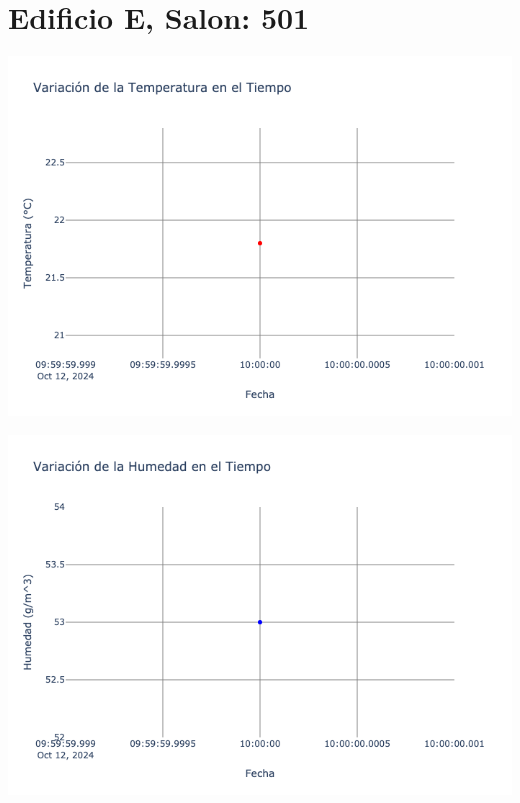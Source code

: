 \documentclass{article}
\begin{document}
    \section{Edificio E, Salon: 501}
    \noindent
    \begin{minipage}{0.48\textwidth}
        \centering
        \includegraphics[width=\textwidth]{../img/poli/TS501-90Dias-03-12-2024.png}
    \end{minipage}
    \hfill
    \begin{minipage}{0.48\textwidth}
        \centering
        \includegraphics[width=\textwidth]{../img/poli/HS501-90Dias-03-12-2024.png}
    \end{minipage}
\end{document}

